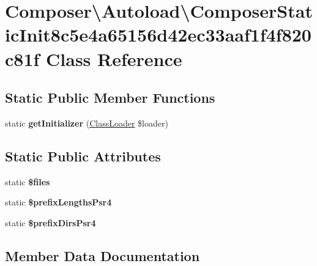 \hypertarget{classComposer_1_1Autoload_1_1ComposerStaticInit8c5e4a65156d42ec33aaf1f4f820c81f}{}\section{Composer\textbackslash{}Autoload\textbackslash{}Composer\+Static\+Init8c5e4a65156d42ec33aaf1f4f820c81f Class Reference}
\label{classComposer_1_1Autoload_1_1ComposerStaticInit8c5e4a65156d42ec33aaf1f4f820c81f}
\subsection*{Static Public Member Functions}
\begin{DoxyCompactItemize}
\item 
\mbox{\label{classComposer_1_1Autoload_1_1ComposerStaticInit8c5e4a65156d42ec33aaf1f4f820c81f_ac97876bf0ed6de7c266598396dca1099}} 
static {\bfseries get\+Initializer} (\hyperlink{classComposer_1_1Autoload_1_1ClassLoader}{Class\+Loader} \$loader)
\end{DoxyCompactItemize}
\subsection*{Static Public Attributes}
\begin{DoxyCompactItemize}
\item 
static {\bfseries \$files}
\item 
static {\bfseries \$prefix\+Lengths\+Psr4}
\item 
static {\bfseries \$prefix\+Dirs\+Psr4}
\end{DoxyCompactItemize}


\subsection{Member Data Documentation}
\mbox{\label{classComposer_1_1Autoload_1_1ComposerStaticInit8c5e4a65156d42ec33aaf1f4f820c81f_a3d1eb388513a3ea459e42890c402d2b7}} 
